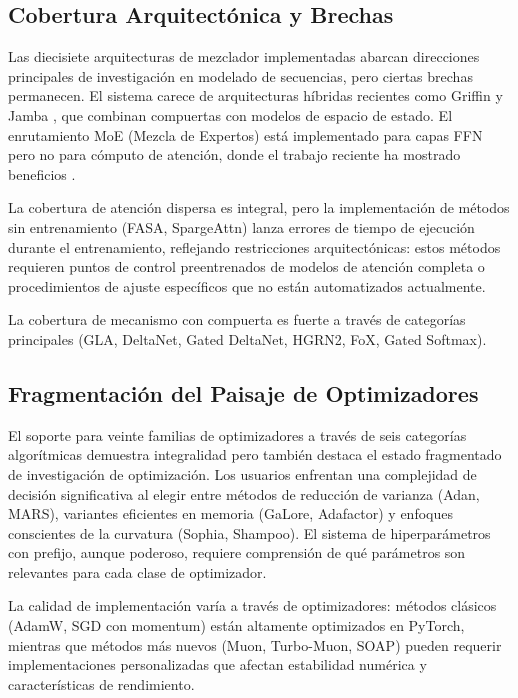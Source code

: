 \documentclass[11pt,a4paper]{article}
\begin{document}
\subsection{Cobertura Arquitectónica y Brechas}

Las diecisiete arquitecturas de mezclador implementadas abarcan direcciones principales de investigación en modelado de secuencias, pero ciertas brechas permanecen. El sistema carece de arquitecturas híbridas recientes como Griffin \citep{soares_griffin_2024} y Jamba \citep{gu_jamba_2024}, que combinan compuertas con modelos de espacio de estado. El enrutamiento MoE (Mezcla de Expertos) está implementado para capas FFN pero no para cómputo de atención, donde el trabajo reciente ha mostrado beneficios \citep{lewis_moe_2021}.

La cobertura de atención dispersa es integral, pero la implementación de métodos sin entrenamiento (FASA, SpargeAttn) lanza errores de tiempo de ejecución durante el entrenamiento, reflejando restricciones arquitectónicas: estos métodos requieren puntos de control preentrenados de modelos de atención completa o procedimientos de ajuste específicos que no están automatizados actualmente.

La cobertura de mecanismo con compuerta es fuerte a través de categorías principales (GLA, DeltaNet, Gated DeltaNet, HGRN2, FoX, Gated Softmax).

\subsection{Fragmentación del Paisaje de Optimizadores}

El soporte para veinte familias de optimizadores a través de seis categorías algorítmicas demuestra integralidad pero también destaca el estado fragmentado de investigación de optimización. Los usuarios enfrentan una complejidad de decisión significativa al elegir entre métodos de reducción de varianza (Adan, MARS), variantes eficientes en memoria (GaLore, Adafactor) y enfoques conscientes de la curvatura (Sophia, Shampoo). El sistema de hiperparámetros con prefijo, aunque poderoso, requiere comprensión de qué parámetros son relevantes para cada clase de optimizador.

La calidad de implementación varía a través de optimizadores: métodos clásicos (AdamW, SGD con momentum) están altamente optimizados en PyTorch, mientras que métodos más nuevos (Muon, Turbo-Muon, SOAP) pueden requerir implementaciones personalizadas que afectan estabilidad numérica y características de rendimiento.
\end{document}
